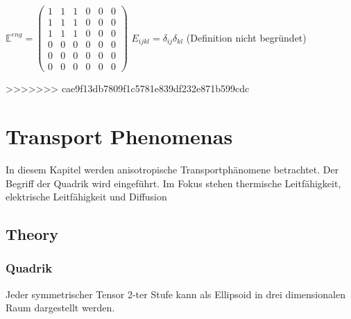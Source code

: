 \documentclass[a4paper]{scrartcl}
\begin{document}
$
\mathbb{E}^{eng}=
\begin{pmatrix}
1 & 1 & 1 & 0 & 0 & 0 \\ 
1 & 1 & 1 & 0 & 0 & 0 \\ 
1 & 1 & 1 & 0 & 0 & 0 \\ 
0 & 0 & 0 & 0 & 0 & 0 \\ 
0 & 0 & 0 & 0 & 0 & 0 \\ 
0 & 0 & 0 & 0 & 0 & 0
\end{pmatrix} 
$ $E_{ijkl} = \delta_{ij} \delta_{kl}$ (Definition nicht
begründet)

>>>>>>> cae9f13db7809f1c5781e839df232e871b599cdc
\section{Transport Phenomenas}
In diesem Kapitel werden anisotropische Transportphänomene betrachtet. Der
Begriff der Quadrik wird eingeführt. Im Fokus stehen thermische Leitfähigkeit,
elektrische Leitfähigkeit und Diffusion
\subsection{Theory}
\subsubsection{Quadrik}
Jeder symmetrischer Tensor 2-ter Stufe kann als Ellipsoid in drei dimensionalen
Raum dargestellt werden.
\end{document}
